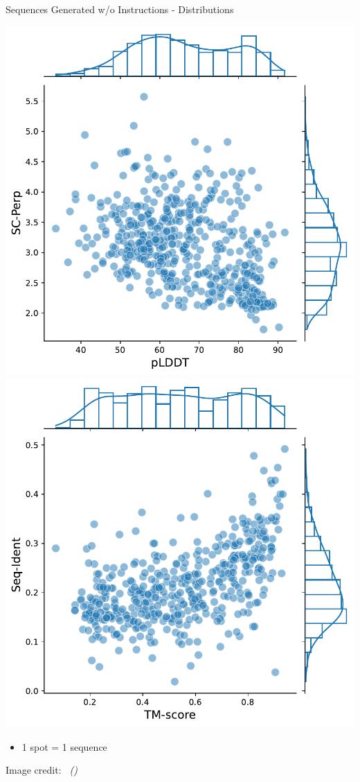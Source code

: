 \documentclass[dvipsnames,
hyperref={colorlinks,citecolor=black}
]{beamer}
\newcommand{\credit}[2]{\par\hfill \tiny #1 credit:~\itshape\citeauthor{#2} (\citeyear{#2})}
\begin{document}
\begin{frame}{Sequences Generated w/o Instructions - Distributions}
	\begin{center}
		\includegraphics[scale=0.35]{images/plddt_scperp.pdf}
		\includegraphics[scale=0.35]{images/tm_sid.pdf}
	\end{center}
	\begin{itemize}
		\item 1 spot = 1 sequence
	\end{itemize}
	\credit{Image}{lv2024prollama}
\end{frame}
\end{document}
